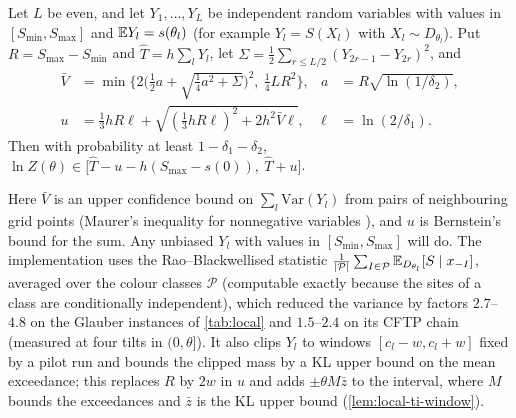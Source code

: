 \begin{lemma}\label{lem:local-ti}
Let $L$ be even, and let $Y_1,\dots,Y_L$ be independent random variables with values in
$[S_{\min},S_{\max}]$ and $\mathbb{E} Y_l=s(\theta_l)$ (for example $Y_l=S(X_l)$ with $X_l\sim D_{\theta_l}$). Put
$R=S_{\max}-S_{\min}$ and $\hat T=h\sum_lY_l$, let
$\Sigma=\frac12\sum_{r\le L/2}(Y_{2r-1}-Y_{2r})^2$, and
\begin{align*}
\bar V&=\min\Big\{2\Big(\tfrac12a+\sqrt{\tfrac14a^2+\Sigma}\Big)^2,\ \tfrac14LR^2\Big\},&
a&=R\sqrt{\ln(1/\delta_2)},\\
u&=\tfrac13hR\ell+\sqrt{(\tfrac13hR\ell)^2+2h^2\bar V\ell},& \ell&=\ln(2/\delta_1).
\end{align*}
Then with probability at least $1-\delta_1-\delta_2$,
$\ln Z(\theta)\in\big[\hat T-u-h(S_{\max}-s(0)),\ \hat T+u\big]$.
\end{lemma}

Here $\bar V$ is an upper confidence bound on $\sum_l\mathrm{Var}(Y_l)$ from pairs of
neighbouring grid points (Maurer's inequality for nonnegative variables
\cite{maurer2003}), and $u$ is Bernstein's bound for the sum. Any unbiased $Y_l$ with
values in $[S_{\min},S_{\max}]$ will do. The implementation uses the
Rao--Blackwellised statistic $\frac1{|\mathcal P|}\sum_{I\in\mathcal P}\mathbb{E}_{D_{\theta_l}}[S\mid
x_{-I}]$, averaged over the colour classes $\mathcal P$ (computable exactly because the
sites of a class are conditionally independent), which reduced the variance by factors
$2.7$--$4.8$ on the Glauber instances of \cref{tab:local} and $1.5$--$2.4$ on its CFTP chain
(measured at four tilts in $(0,\theta]$). It also clips $Y_l$ to windows $[c_l-w,c_l+w]$ fixed by a
pilot run and bounds the clipped mass by a KL upper bound on the mean exceedance; this
replaces $R$ by $2w$ in $u$ and adds $\pm\theta M\bar z$ to the interval, where $M$
bounds the exceedances and $\bar z$ is the KL upper bound
(\cref{lem:local-ti-window}).

